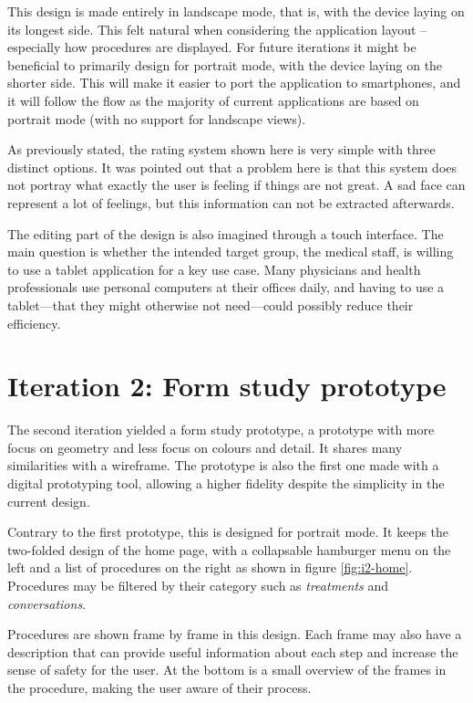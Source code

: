 This design is made entirely in landscape mode, that is, with the device laying on its longest side. This felt natural when considering the application layout -- especially how procedures are displayed. For future iterations it might be beneficial to primarily design for portrait mode, with the device laying on the shorter side. This will make it easier to port the application to smartphones, and it will follow the flow as the majority of current applications are based on portrait mode (with no support for landscape views).

As previously stated, the rating system shown here is very simple with three distinct options. It was pointed out that a problem here is that this system does not portray what exactly the user is feeling if things are not great. A sad face can represent a lot of feelings, but this information can not be extracted afterwards.

The editing part of the design is also imagined through a touch interface. The main question is whether the intended target group, the medical staff, is willing to use a tablet application for a key use case. Many physicians and health professionals use personal computers at their offices daily, and having to use a tablet---that they might otherwise not need---could possibly reduce their efficiency.

\section{Iteration 2: Form study prototype}
\label{sec:iteration2}

The second iteration yielded a form study prototype, a prototype with more focus on geometry and less focus on colours and detail. It shares many similarities with a wireframe. The prototype is also the first one made with a digital prototyping tool, allowing a higher fidelity despite the simplicity in the current design.

Contrary to the first prototype, this is designed for portrait mode. It keeps the two-folded design of the home page, with a collapsable hamburger menu on the left and a list of procedures on the right as shown in figure \ref{fig:i2-home}. Procedures may be filtered by their category such as \emph{treatments} and \emph{conversations}.

Procedures are shown frame by frame in this design. Each frame may also have a description that can provide useful information about each step and increase the sense of safety for the user. At the bottom is a small overview of the frames in the procedure, making the user aware of their process.


